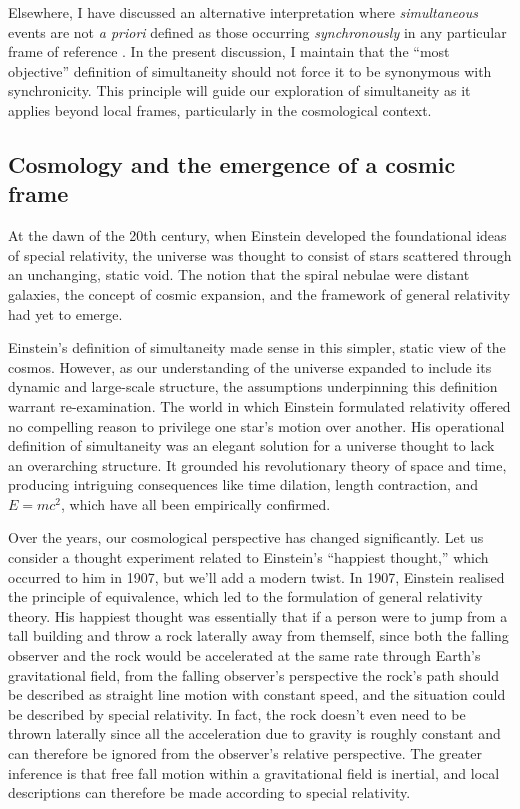 \documentclass[aps,rmp,groupedaddress,twocolumn,10pt]{revtex4-2}
\begin{document}
Elsewhere, I have discussed an alternative interpretation where \textit{simultaneous} events are not \textit{a priori} defined as those occurring \textit{synchronously} in any particular frame of reference \cite{Janzen2015}. In the present discussion, I maintain that the ``most objective'' definition of simultaneity should not force it to be synonymous with synchronicity. This principle will guide our exploration of simultaneity as it applies beyond local frames, particularly in the cosmological context.

\subsection{Cosmology and the emergence of a cosmic frame}

At the dawn of the 20th century, when Einstein developed the foundational ideas of special relativity, the universe was thought to consist of stars scattered through an unchanging, static void. The notion that the spiral nebulae were distant galaxies, the concept of cosmic expansion, and the framework of general relativity had yet to emerge.

Einstein's definition of simultaneity made sense in this simpler, static view of the cosmos. However, as our understanding of the universe expanded to include its dynamic and large-scale structure, the assumptions underpinning this definition warrant re-examination. The world in which Einstein formulated relativity offered no compelling reason to privilege one star's motion over another. His operational definition of simultaneity was an elegant solution for a universe thought to lack an overarching structure. It grounded his revolutionary theory of space and time, producing intriguing consequences like time dilation, length contraction, and $E=mc^2$, which have all been empirically confirmed.

Over the years, our cosmological perspective has changed significantly. Let us consider a thought experiment related to Einstein's ``happiest thought,'' which occurred to him in 1907, but we'll add a modern twist. In 1907, Einstein realised the principle of equivalence, which led to the formulation of general relativity theory. His happiest thought was essentially that if a person were to jump from a tall building and throw a rock laterally away from themself, since both the falling observer and the rock would be accelerated at the same rate through Earth's gravitational field, from the falling observer's perspective the rock's path should be described as straight line motion with constant speed, and the situation could be described by special relativity. In fact, the rock doesn't even need to be thrown laterally since all the acceleration due to gravity is roughly constant and can therefore be ignored from the observer's relative perspective. The greater inference is that free fall motion within a gravitational field is inertial, and local descriptions can therefore be made according to special relativity.
\end{document}
